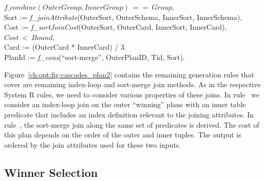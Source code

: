 \begin{figure*}
\begin{boxedminipage}{\linewidth}
\datalogspace $f\_combine(OuterGroup, InnerGroup)\ ==\ Group$, \\
\datalogspace Sort := {\em f\_joinAttribute}(OuterSort, OuterSchema, InnerSort, InnerSchema), \\
\datalogspace Cost := {\em f\_sortJoinCost}(OuterSort, OuterCard, InnerSort, InnerCard), \\
\datalogspace $Cost\ <\ Bound$, \\
\datalogspace Card := (OuterCard * InnerCard) / 3. \\
\datalogspace PlanId := {\em f\_cons}(``sort-merge'', OuterPlanID, Tid, Sort).

\end{boxedminipage}
\caption{\label{ch:opt:fig:cascades_plan2} Cascades plan generation rules for index-loop
and sort-merge join methods.}
\end{figure*}

Figure~\ref{ch:opt:fig:cascades_plan2} contains the remaining 
generation rules that cover are remaining index-loop and sort-merge join
methods.  As in the respective System R rules, we need to consider various
properties of these joins.  In rule~ we consider an index-loop join on
the outer ``winning'' plans with an inner table predicate that includes an
index definition relevant to the joining attributes.  In rule~, the
sort-merge join along the same set of predicates is derived.  The cost of this
plan depends on the order of the outer and inner tuples.  The output is ordered
by the join attributes used for these two inputs.

\subsection{Winner Selection}
\label{ch:opt:sec:cascades_winner}

